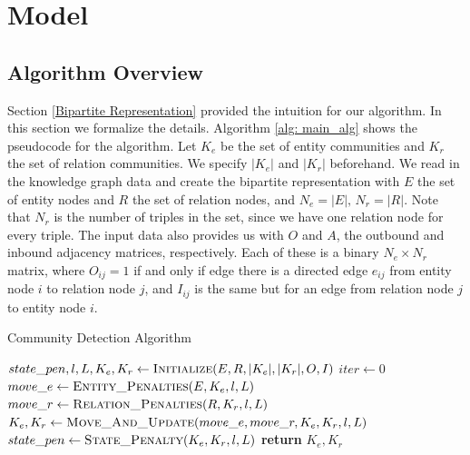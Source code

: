 \documentclass[12pt]{article}
\begin{document}
\section{Model}
\label{Model}

\subsection{Algorithm Overview}
\label{Algorithm Overview}

Section \ref{Bipartite Representation} provided the intuition for our algorithm.
In this section we formalize the details. Algorithm \ref{alg: main_alg} shows
the pseudocode for the algorithm. Let $K_e$ be the set of entity communities and
$K_r$ the set of relation communities. We specify $|K_e|$ and $|K_r|$
beforehand. We read in the knowledge graph data and create the bipartite
representation with $E$ the set of entity nodes and $R$ the set of relation
nodes, and $N_e = |E|,\,N_r = |R|$. Note that $N_r$ is the number of triples
in the set, since we have one relation node for every triple.
The
input data also provides us with $O$ and $A$, the outbound and inbound adjacency
matrices, respectively. Each of these is a binary $N_e\times N_r$ matrix, where
$O_{ij} = 1$ if and only if edge there is a directed edge $e_{ij}$ from entity
node $i$ to relation node $j$, and $I_{ij}$ is the same but for an edge from
relation node $j$ to entity node $i$.

\begin{algorithm}[t!]
\caption{Community Detection Algorithm}\label{alg: main_alg}
\begin{algorithmic}[1]

    \State $state\_pen, l, L, K_e, K_r\gets \Call{Initialize}{E, R, |K_e|, |K_r|, O, I}$
    \State $iter\gets 0$
        \State $move\_e\gets \Call{Entity\_Penalties}{E, K_e, l, L}$
        \State $move\_r\gets \Call{Relation\_Penalties}{R, K_r, l, L}$
        \State $K_e,K_r\gets \Call{Move\_And\_Update}{move\_e, move\_r, K_e, K_r, l, L}$
        \State $state\_pen\gets \Call{State\_Penalty}{K_e, K_r, l, L}$
    \EndWhile
    \State \textbf{return} $K_e, K_r$
\EndFunction

\end{algorithmic}
\end{algorithm}
\end{document}
